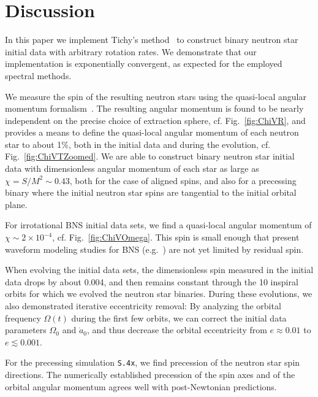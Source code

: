 {\section{Discussion}
\label{sec:Discussion}


In this paper we implement Tichy's method~\cite{Tichy:2012rp} to
construct binary neutron star initial data with arbitrary rotation
rates.  We demonstrate that our implementation is exponentially
convergent, as expected for the employed spectral methods.


We measure the spin of the resulting neutron stars using the
quasi-local angular momentum
formalism~\cite{BrownYork1993,Cook2007,Lovelace2008,OwenThesis}.  The
resulting angular momentum is found to be nearly independent on the
precise choice of extraction sphere, cf. Fig.~\ref{fig:ChiVR}, and
provides a means to define the quasi-local angular momentum of each
neutron star to about 1\%, both in the initial data and during the
evolution, cf. Fig.~\ref{fig:ChiVTZoomed}.  We are able to construct
binary neutron star initial data with dimensionless angular momentum
of each star as large as $\chi=S/M^2\sim 0.43$, both for the case of
aligned spins, and also for a precessing binary where the initial
neutron star spins are tangential to the initial orbital plane.

For irrotational BNS initial data sets, we find a quasi-local
  angular momentum of $\chi\sim 2\times 10^{-4}$,
  cf. Fig.~\ref{fig:ChiVOmega}. This spin is small enough that present
  waveform modeling studies for BNS
  (e.g.~\cite{Bernuzzi:2014owa,Baiotti2011,Baiotti:2010xh}) are not
  yet limited by residual spin.



When evolving the initial data sets, the dimensionless spin measured
in the initial data drops by about 0.004, and then remains constant
through the 10 inspiral orbits for which we evolved the neutron star
binaries.  During these evolutions, we also demonstrated iterative
eccentricity removal: By analyzing the orbital frequency $\Omega(t)$
during the first few orbits, we can correct the initial data
parameters $\Omega_0$ and $\dot a_0$, and thus decrease the orbital
eccentricity from $e\approx 0.01$ to $e\lesssim 0.001$.



For the precessing simulation {\tt S.4x}, we find precession of the neutron
star spin directions.  The numerically established precession of the
spin axes and of the orbital angular momentum agrees well with
post-Newtonian predictions.


}

